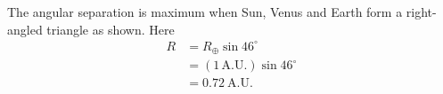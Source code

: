 The angular separation is maximum when Sun, Venus and Earth form a
right-angled triangle as shown. Here
\begin{align*}
R &= R_\oplus \sin 46^\circ\\
  &= (1\,\mathrm{A.U.})\sin 46^\circ\\
  &= 0.72\ \mathrm{A.U.}
\end{align*}
